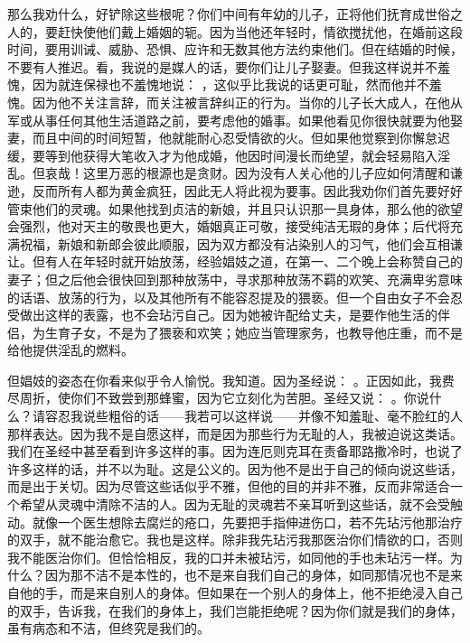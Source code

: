 那么我劝什么，好铲除这些根呢？你们中间有年幼的儿子，正将他们抚育成世俗之人的，要赶快使他们戴上婚姻的轭。因为当他还年轻时，情欲搅扰他，在婚前这段时间，要用训诫、威胁、恐惧、应许和无数其他方法约束他们。但在结婚的时候，不要有人推迟。看，我说的是媒人的话，要你们让儿子娶妻。但我这样说并不羞愧，因为就连保禄也不羞愧地说： ，这似乎比我说的话更可耻，然而他并不羞愧。因为他不关注言辞，而关注被言辞纠正的行为。当你的儿子长大成人，在他从军或从事任何其他生活道路之前，要考虑他的婚事。如果他看见你很快就要为他娶妻，而且中间的时间短暂，他就能耐心忍受情欲的火。但如果他觉察到你懈怠迟缓，要等到他获得大笔收入才为他成婚，他因时间漫长而绝望，就会轻易陷入淫乱。但哀哉！这里万恶的根源也是贪财。因为没有人关心他的儿子应如何清醒和谦逊，反而所有人都为黄金疯狂，因此无人将此视为要事。因此我劝你们首先要好好管束他们的灵魂。如果他找到贞洁的新娘，并且只认识那一具身体，那么他的欲望会强烈，他对天主的敬畏也更大，婚姻真正可敬，接受纯洁无瑕的身体；后代将充满祝福，新娘和新郎会彼此顺服，因为双方都没有沾染别人的习气，他们会互相谦让。但有人在年轻时就开始放荡，经验娼妓之道，在第一、二个晚上会称赞自己的妻子；但之后他会很快回到那种放荡中，寻求那种放荡不羁的欢笑、充满卑劣意味的话语、放荡的行为，以及其他所有不能容忍提及的猥亵。但一个自由女子不会忍受做出这样的表露，也不会玷污自己。因为她被许配给丈夫，是要作他生活的伴侣，为生育子女，不是为了猥亵和欢笑；她应当管理家务，也教导他庄重，而不是给他提供淫乱的燃料。\par

但娼妓的姿态在你看来似乎令人愉悦。我知道。因为圣经说： 。正因如此，我费尽周折，使你们不致尝到那蜂蜜，因为它立刻化为苦胆。圣经又说： 。你说什么？请容忍我说些粗俗的话——我若可以这样说——并像不知羞耻、毫不脸红的人那样表达。因为我不是自愿这样，而是因为那些行为无耻的人，我被迫说这类话。我们在圣经中甚至看到许多这样的事。因为连厄则克耳在责备耶路撒冷时，也说了许多这样的话，并不以为耻。这是公义的。因为他不是出于自己的倾向说这些话，而是出于关切。因为尽管这些话似乎不雅，但他的目的并非不雅，反而非常适合一个希望从灵魂中清除不洁的人。因为无耻的灵魂若不亲耳听到这些话，就不会受触动。就像一个医生想除去腐烂的疮口，先要把手指伸进伤口，若不先玷污他那治疗的双手，就不能治愈它。我也是这样。除非我先玷污我那医治你们情欲的口，否则我不能医治你们。但恰恰相反，我的口并未被玷污，如同他的手也未玷污一样。为什么？因为那不洁不是本性的，也不是来自我们自己的身体，如同那情况也不是来自他的手，而是来自别人的身体。但如果在一个别人的身体上，他不拒绝浸入自己的双手，告诉我，在我们的身体上，我们岂能拒绝呢？因为你们就是我们的身体，虽有病态和不洁，但终究是我们的。\par

